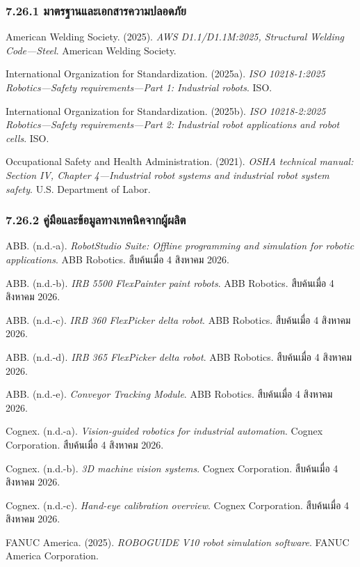 \subsubsection{7.26.1 มาตรฐานและเอกสารความปลอดภัย}

American Welding Society. (2025). \textit{AWS D1.1/D1.1M:2025, Structural Welding Code—Steel}. American Welding Society.

International Organization for Standardization. (2025a). \textit{ISO 10218-1:2025 Robotics—Safety requirements—Part 1: Industrial robots}. ISO.

International Organization for Standardization. (2025b). \textit{ISO 10218-2:2025 Robotics—Safety requirements—Part 2: Industrial robot applications and robot cells}. ISO.

Occupational Safety and Health Administration. (2021). \textit{OSHA technical manual: Section IV, Chapter 4—Industrial robot systems and industrial robot system safety}. U.S. Department of Labor.

\subsubsection{7.26.2 คู่มือและข้อมูลทางเทคนิคจากผู้ผลิต}

ABB. (n.d.-a). \textit{RobotStudio Suite: Offline programming and simulation for robotic applications}. ABB Robotics. สืบค้นเมื่อ 4 สิงหาคม 2026.

ABB. (n.d.-b). \textit{IRB 5500 FlexPainter paint robots}. ABB Robotics. สืบค้นเมื่อ 4 สิงหาคม 2026.

ABB. (n.d.-c). \textit{IRB 360 FlexPicker delta robot}. ABB Robotics. สืบค้นเมื่อ 4 สิงหาคม 2026.

ABB. (n.d.-d). \textit{IRB 365 FlexPicker delta robot}. ABB Robotics. สืบค้นเมื่อ 4 สิงหาคม 2026.

ABB. (n.d.-e). \textit{Conveyor Tracking Module}. ABB Robotics. สืบค้นเมื่อ 4 สิงหาคม 2026.

Cognex. (n.d.-a). \textit{Vision-guided robotics for industrial automation}. Cognex Corporation. สืบค้นเมื่อ 4 สิงหาคม 2026.

Cognex. (n.d.-b). \textit{3D machine vision systems}. Cognex Corporation. สืบค้นเมื่อ 4 สิงหาคม 2026.

Cognex. (n.d.-c). \textit{Hand-eye calibration overview}. Cognex Corporation. สืบค้นเมื่อ 4 สิงหาคม 2026.

FANUC America. (2025). \textit{ROBOGUIDE V10 robot simulation software}. FANUC America Corporation.

